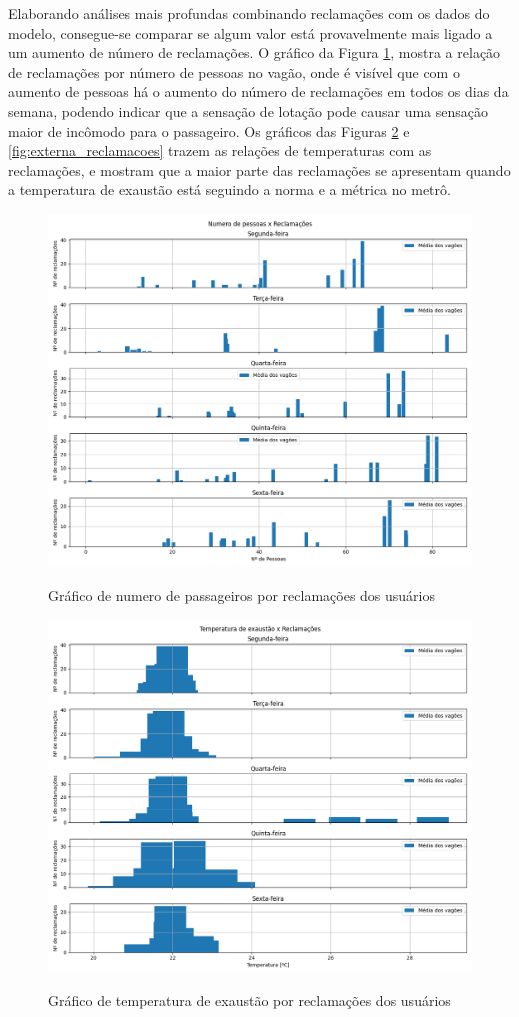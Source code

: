 \documentclass[acronym,symbols,table]{fei}
\begin{document}
Elaborando análises mais profundas combinando reclamações com os dados do modelo, consegue-se comparar se algum valor está provavelmente mais ligado a um aumento de número de reclamações. O gráfico da Figura \ref{fig:numero_reclamacoes}, mostra a relação de reclamações por número de pessoas no vagão, onde é visível que com o aumento de pessoas há o aumento do número de reclamações em todos os dias da semana, podendo indicar que a sensação de lotação pode causar uma sensação maior de incômodo para o passageiro. Os gráficos das Figuras \ref{fig:exaustao_reclamacoes} e \ref{fig:externa_reclamacoes} trazem as relações de temperaturas com as reclamações, e mostram que a maior parte das reclamações se apresentam quando a temperatura de exaustão está seguindo a norma e a métrica no metrô. %

\begin{figure}[!htb]
    \centering
    \caption{Gráfico de numero de passageiros por reclamações dos usuários}
    \includegraphics[width=0.7\linewidth]{Imagens/Numero_de_pessoas_x_Reclamacoes.png}
    \label{fig:numero_reclamacoes}
\end{figure}

\begin{figure}[!htb]
    \centering
    \caption{Gráfico de temperatura de exaustão por reclamações dos usuários}
    \includegraphics[width=0.7\linewidth]{Imagens/Temperatura_de_exaustao_x_Reclamacoes.png}
    \label{fig:exaustao_reclamacoes}
\end{figure}
\end{document}
